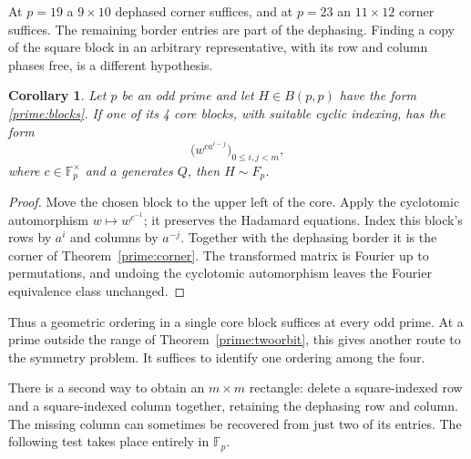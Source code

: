 \documentclass[11pt,a4paper]{article}
\newtheorem{corollary}[theorem]{Corollary}
\numberwithin{equation}{section}
\begin{document}
At $p=19$ a $9\times10$ dephased corner suffices, and at $p=23$ an $11\times12$ corner suffices. The remaining border entries are part of the dephasing. Finding a copy of the square block in an arbitrary representative, with its row and column phases free, is a different hypothesis.

\begin{corollary}\label{prime:oneblock}
Let $p$ be an odd prime and let $H\in B(p,p)$ have the form \eqref{prime:blocks}. If one of its 4 core blocks, with suitable cyclic indexing, has the form
$$\big(w^{ca^{i-j}}\big)_{0\le i,j<m},$$
where $c\in\mathbb F_p^\times$ and $a$ generates $Q$, then $H\sim F_p$.
\end{corollary}
\begin{proof}
Move the chosen block to the upper left of the core. Apply the cyclotomic automorphism $w\mapsto w^{c^{-1}}$; it preserves the Hadamard equations. Index this block's rows by $a^i$ and columns by $a^{-j}$. Together with the dephasing border it is the corner of Theorem~\ref{prime:corner}. The transformed matrix is Fourier up to permutations, and undoing the cyclotomic automorphism leaves the Fourier equivalence class unchanged.
\end{proof}

Thus a geometric ordering in a single core block suffices at every odd prime. At a prime outside the range of Theorem~\ref{prime:twoorbit}, this gives another route to the symmetry problem. It suffices to identify one ordering among the four.

There is a second way to obtain an $m\times m$ rectangle: delete a square-indexed row and a square-indexed column together, retaining the dephasing row and column. The missing column can sometimes be recovered from just two of its entries. The following test takes place entirely in $\mathbb F_p$.
\end{document}
